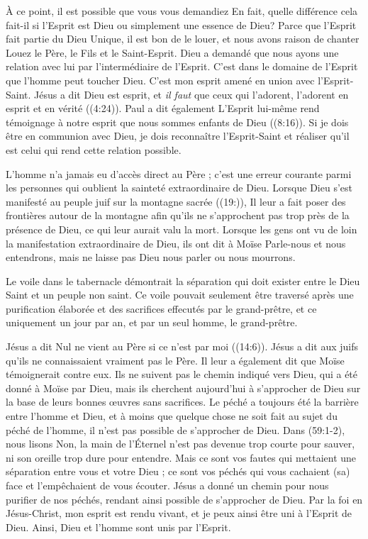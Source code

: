 À ce point, il est possible que vous vous demandiez\frcolon{}
 \Og En fait, quelle différence cela fait-il si l'Esprit est Dieu
 ou simplement une essence de Dieu? \Fg{}
 Parce que l'Esprit fait partie du Dieu Unique, il est bon de le louer,
 et nous avons raison de chanter\frcolon{}
 \Og Louez le Père, le Fils et le Saint-Esprit. \Fg{}
 Dieu a demandé que nous ayons une relation avec lui par l'intermédiaire
 de l'Esprit. C'est dans le domaine de l'Esprit que l'homme peut toucher Dieu.
 C'est mon esprit amené en union avec l'Esprit-Saint. Jésus a dit\frcolon{}
 \Og Dieu est esprit, et \emph{il faut} que ceux qui l'adorent, l'adorent en esprit
 et en vérité \Fg{} ((4:24)).
 Paul a dit également\frcolon{} \Og L'Esprit lui-même rend témoignage à notre esprit
 que nous sommes enfants de Dieu \Fg{} ((8:16)).
 Si je dois être en communion avec Dieu, je dois reconnaître l'Esprit-Saint
 et réaliser qu'il est celui qui rend cette relation possible.

L'homme n'a jamais eu d'accès direct au Père ; c'est une erreur courante parmi
 les personnes qui oublient la sainteté extraordinaire de Dieu.
 Lorsque Dieu s'est manifesté au peuple juif sur la montagne sacrée
 ((19:)), Il leur a fait poser des frontières autour de
 la montagne afin qu'ils ne s'approchent pas trop près de la présence
 de Dieu, ce qui leur aurait valu la mort.
 Lorsque les gens ont vu de loin la manifestation extraordinaire de Dieu,
 ils ont dit à Moïse\frcolon{}
 \Og Parle-nous et nous entendrons, mais ne laisse pas Dieu nous parler
 ou nous mourrons. \Fg{}

Le voile dans le tabernacle démontrait la séparation qui doit exister entre
 le Dieu Saint et un peuple non saint.
 Ce voile pouvait seulement être traversé après une purification élaborée
 et des sacrifices effecutés par le grand-prêtre, et ce uniquement un jour par an,
 et par un seul homme, le grand-prêtre.

Jésus a dit\frcolon{} \Og Nul ne vient au Père si ce n'est par moi \Fg{}
 ((14:6)).
 Jésus a dit aux juifs qu'ils ne connaissaient vraiment pas le Père.
 Il leur a également dit que Moïse témoignerait contre eux.
 Ils ne suivent pas le chemin indiqué vers Dieu, qui a été donné
 à Moïse par Dieu, mais ils cherchent aujourd'hui à s'approcher de Dieu
 sur la base de leurs bonnes œuvres sans sacrifices.
 Le péché a toujours été la barrière entre l'homme et Dieu, et à moins
 que quelque chose ne soit fait au sujet du péché de l'homme,
 il n'est pas possible de s'approcher de Dieu.
 Dans (59:1-2), nous lisons\frcolon{}
 \Og Non, la main de l'Éternel n'est pas devenue trop courte pour sauver,
 ni son oreille trop dure pour entendre.
 Mais ce sont vos fautes qui mettaient une séparation entre vous et votre Dieu ;
 ce sont vos péchés qui vous cachaient (sa) face et l'empêchaient
 de vous écouter. \Fg{}
 Jésus a donné un chemin pour nous purifier de nos péchés,
 rendant ainsi possible de s'approcher de Dieu.
 Par la foi en Jésus-Christ, mon esprit est rendu vivant, et je peux ainsi
 être uni à l'Esprit de Dieu. Ainsi, Dieu et l'homme sont unis par l'Esprit.
\closechapter


